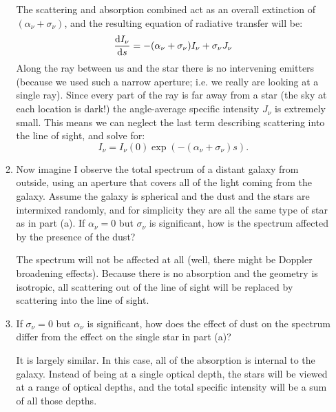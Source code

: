 \documentclass[11pt, preprint]{article}
\begin{document}
\begin{enumerate}
\begin{enumerate}
      \begin{answer}
        The scattering and absorption combined act as an
        overall extinction of 
        $(\alpha_\nu + \sigma_\nu)$, and the resulting equation of
        radiative transfer will be:
        \begin{equation}
          \frac{{\rm d}I_\nu}{{\rm d}s} = -(\alpha_\nu + \sigma_\nu)
          I_\nu + \sigma_\nu J_\nu
        \end{equation}
        Along the ray between us and the star there is no intervening
        emitters (because we used such a narrow aperture; i.e. we
        really are looking at a single ray). Since every part of the
        ray is far away from a star (the sky at each location is
        dark!) the angle-average specific intensity $J_\nu$ is
        extremely small. This means we can neglect the last term
        describing scattering into the line of sight, and solve for:
        \begin{equation}
          I_\nu = I_\nu(0) \exp\left(-(\alpha_\nu + \sigma_\nu)
          s\right).
        \end{equation}
      \end{answer}
    \item Now imagine I observe the total spectrum of a distant galaxy
      from outside, using an aperture that covers all of the light
      coming from the galaxy. Assume the galaxy is spherical and the
      dust and the stars are intermixed randomly, and for simplicity
      they are all the same type of star as in part (a).  If
      $\alpha_\nu = 0$ but $\sigma_\nu$ is significant, how is the
      spectrum affected by the presence of the dust?

      \begin{answer}
        The spectrum will not be affected at all (well, there might be
        Doppler broadening effects). Because there is no absorption
        and the geometry is isotropic, all scattering out of the line of
        sight will be replaced by scattering into the line of sight.
      \end{answer}
    \item If $\sigma_\nu = 0$ but $\alpha_\nu$ is significant, how
      does the effect of dust on the spectrum differ from the effect
      on the single star in part (a)?

      \begin{answer}
        It is largely similar. In this case, all of the absorption is
        internal to the galaxy. Instead of being at a single optical
        depth, the stars will be viewed at a range of optical
        depths, and the total specific intensity will be a sum of all
        those depths.


\end{answer}
\end{enumerate}
\end{enumerate}
\end{document}
